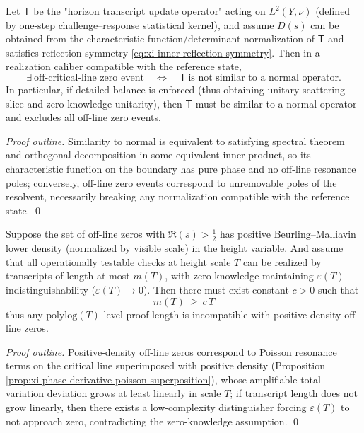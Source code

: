 \begin{proposition}\label{prop:xi-nonnormality-obstruction-offcritical}
Let \(\mathsf{T}\) be the "horizon transcript update operator" acting on \(L^2(Y,\nu)\) (defined by one-step challenge--response statistical kernel), and assume \(D(s)\) can be obtained from the characteristic function/determinant normalization of \(\mathsf{T}\) and satisfies reflection symmetry \eqref{eq:xi-inner-reflection-symmetry}.
Then in a realization caliber compatible with the reference state,
\[
\boxed{\;
\exists\ \text{off-critical-line zero event}\quad\Longleftrightarrow\quad
\mathsf{T}\ \text{is not similar to a normal operator}. \;}
\]
In particular, if detailed balance is enforced (thus obtaining unitary scattering slice and zero-knowledge unitarity), then \(\mathsf{T}\) must be similar to a normal operator and excludes all off-line zero events.
\end{proposition}
\begin{proof}[Proof outline]
Similarity to normal is equivalent to satisfying spectral theorem and orthogonal decomposition in some equivalent inner product, so its characteristic function on the boundary has pure phase and no off-line resonance poles;
conversely, off-line zero events correspond to unremovable poles of the resolvent, necessarily breaking any normalization compatible with the reference state. \qed
\end{proof}

\begin{proposition}\label{prop:xi-bm-density-forces-linear-transcript-length}
Suppose the set of off-line zeros with \(\Re(s)>\tfrac12\) has positive Beurling--Malliavin lower density (normalized by visible scale) in the height variable.
And assume that all operationally testable checks at height scale \(T\) can be realized by transcripts of length at most \(m(T)\), with zero-knowledge maintaining \(\varepsilon(T)\)-indistinguishability (\(\varepsilon(T)\to 0\)).
Then there must exist constant \(c>0\) such that
\[
\boxed{\; m(T)\ \ge\ c\,T\;}
\]
thus any \(\mathrm{polylog}(T)\) level proof length is incompatible with positive-density off-line zeros.
\end{proposition}
\begin{proof}[Proof outline]
Positive-density off-line zeros correspond to Poisson resonance terms on the critical line superimposed with positive density (Proposition \ref{prop:xi-phase-derivative-poisson-superposition}), whose amplifiable total variation deviation grows at least linearly in scale \(T\);
if transcript length does not grow linearly, then there exists a low-complexity distinguisher forcing \(\varepsilon(T)\) to not approach zero, contradicting the zero-knowledge assumption. \qed
\end{proof}

\endinput
